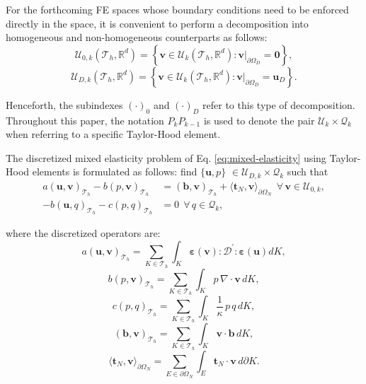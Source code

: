 \documentclass[english,11pt,3p,number,sort&compress]{elsarticle}
\begin{document}
For the forthcoming FE spaces whose boundary conditions need to be enforced directly in the space, it is convenient to perform a decomposition into homogeneous and non-homogeneous counterparts as follows:
\begin{equation}
    \label{eq:uTH0}
    \mathcal{U}_{0,k}(\mathcal{T}_h,\mathbb{R}^d)=\left\{ \bm{v} \in \mathcal{U}_k(\mathcal{T}_h,\mathbb{R}^d) : \bm{v} \lvert_{\partial\Omega_D}=\bm{0}\right\},
\end{equation}
\begin{equation}
    \label{eq:uTHD}
    \mathcal{U}_{D,k}(\mathcal{T}_h,\mathbb{R}^d)=\left\{ \bm{v} \in \mathcal{U}_k(\mathcal{T}_h,\mathbb{R}^d) : \bm{v} \lvert_{\partial\Omega_D}=\bm{u}_D\right\}.
\end{equation}

\noindent Henceforth, the subindexes $(\cdot)_0$ and $(\cdot)_D$ refer to this type of decomposition. Throughout this paper, the notation $P_k P_{k-1}$ is used to denote the pair $\mathcal{U}_k \times \mathcal{Q}_k$ when referring to a specific Taylor-Hood element.

The discretized mixed elasticity problem of Eq. \eqref{eq:mixed-elasticity} using Taylor-Hood elements is formulated as follows: find $\{\bm{u},p\}$ $\in \mathcal{U}_{D,k} \times \mathcal{Q}_k$ such that
\begin{subequations} \label{eq:TH-weak}
	\begin{align}
		a\left(\bm{u},\bm{v}\right)_{\mathcal{T}_h} - b\left( p, \bm{v}\right)_{\mathcal{T}_h} &= \left(\bm{b},\bm{v}\right)_{\mathcal{T}_h} + \langle\bm{t}_N,\bm{v}\rangle_{\partial\Omega_N} ~~\forall\, \bm{v} \in \mathcal{U}_{0,k},\label{eq:TH-weak-a}\\ 
		-b\left(\bm{u}, q\right)_{\mathcal{T}_h} - c\left(p,q \right)_{\mathcal{T}_h} &= 0 ~~\forall\, q \in \mathcal{Q}_k, \label{eq:TH-weak-b}
	\end{align}
\end{subequations}

\noindent where the discretized operators are:
\begin{equation*}
	a\left(\bm{u},\bm{v}\right)_{\mathcal{T}_h} = \sum_{K \in \mathcal{T}_h} \int_{K} \bm{\varepsilon}(\bm{v}) : \mathcal{D}^{'} : \bm{\varepsilon}(\bm{u}) dK ,
\end{equation*}
\begin{equation*}
	b\left(p, \bm{v}\right)_{\mathcal{T}_h} = \sum_{K \in \mathcal{T}_h} \int_{K} p \,\nabla \cdot \bm{v} \, dK ,
\end{equation*}
\begin{equation*}
	c\left(p,q \right)_{\mathcal{T}_h} = \sum_{K \in \mathcal{T}_h} \int_{K} \frac{1}{\kappa} \,p \,q \, dK ,
\end{equation*}
\begin{equation*}
	\left(\bm{b},\bm{v}\right)_{\mathcal{T}_h} = \sum_{K \in \mathcal{T}_h} \int_{K} \bm{v} \cdot \bm{b} \, dK ,
\end{equation*}
\begin{equation*}
	\langle\bm{t}_N,\bm{v}\rangle_{\partial\Omega_N} = \sum_{E \in \partial\Omega_N} \int_{E} \bm{t}_N \cdot \bm{v} \, d\partial K .
\end{equation*}
\end{document}
